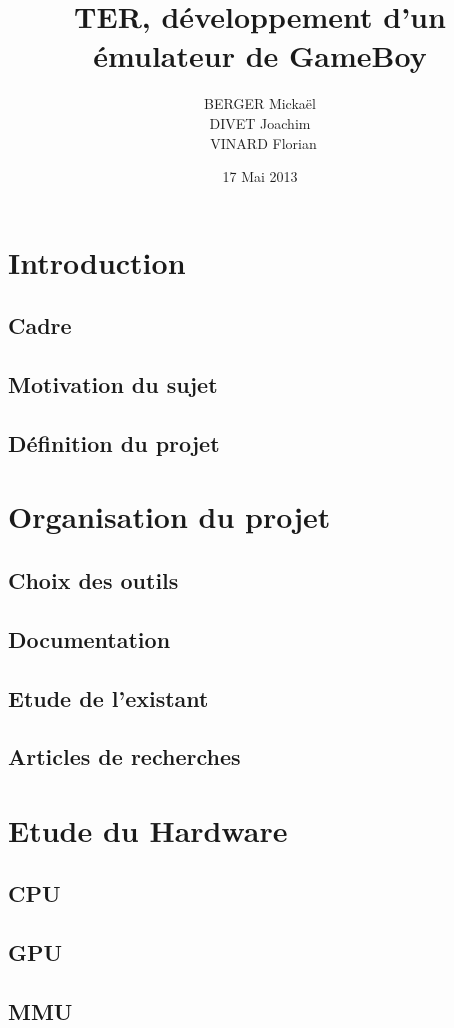 \documentclass{report}
\title{TER, développement d'un émulateur de GameBoy}
\author{BERGER Mickaël \\ DIVET Joachim \\ VINARD Florian}
\date{17 Mai 2013}
\begin{document}
\maketitle

\tableofcontents
\chapter{Introduction}
\section{Cadre}
\section{Motivation du sujet}
\section{Définition du projet}

\chapter{Organisation du projet}
\section{Choix des outils}
\section{Documentation}
\section{Etude de l'existant}
\section{Articles de recherches}

\chapter{Etude du Hardware}
\section{CPU}
\section{GPU}
\section{MMU}
\end{document}
